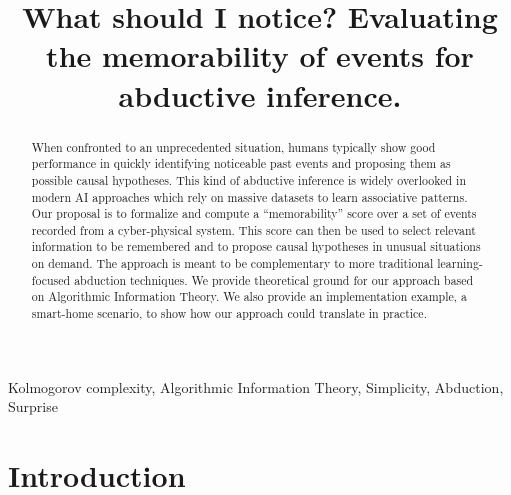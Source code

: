 \documentclass[conference]{IEEEtran}
\begin{document}
\title{
What should I notice? Evaluating the memorability of events for abductive inference.
}
\author{

}

\maketitle

\begin{abstract}
  When confronted to an unprecedented situation, humans typically show good
  performance in quickly identifying noticeable past events and proposing them
  as possible causal hypotheses. This kind of abductive inference is widely
  overlooked in modern AI approaches which rely on massive datasets to learn
  associative patterns. Our proposal is to formalize and compute a ``memorability''
score over a set of events recorded from a cyber-physical system.
This score can then be used to select relevant information to be
remembered and to propose causal hypotheses in unusual situations on demand.
The approach is meant to be complementary to more traditional
learning-focused abduction techniques. We provide theoretical ground for our approach
based on Algorithmic Information
Theory. We also provide an implementation example, a
smart-home scenario, to show how our approach could translate in practice.
\end{abstract}

\begin{IEEEkeywords}
Kolmogorov complexity, Algorithmic Information Theory, Simplicity, Abduction, Surprise
\end{IEEEkeywords}

\section{Introduction}

\end{document}
